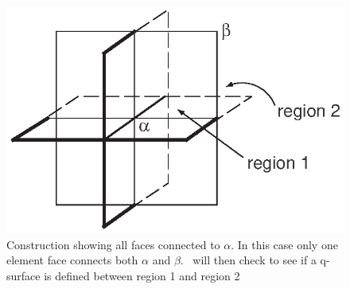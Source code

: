 \documentclass[a4paper]{article}
\begin{document}
\begin{figure}
  \includegraphics{surfaceint}
  \caption{Construction showing all faces connected to $\alpha$. In this case only one element face connects both $\alpha$ and $\beta$. \zinc\ will then check to see if a q-surface is defined between region 1 and region 2}
  \label{surfaceint}  
\end{figure}
\end{document}
